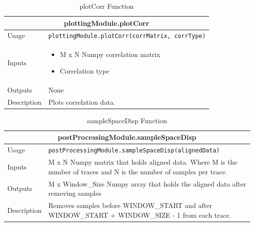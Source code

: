 \documentclass{llncs}
\numberwithin{algorithm}{chapter}
\begin{document}
\begin{table}[H]
\caption{plotCorr Function}
\begin{tabular}{ |p{2cm}||p{11cm}|  }
 \hline
 \multicolumn{2}{|c|}{\cellcolor{teal}\textbf{plottingModule.plotCorr}} \\
 \hline
 Usage & \texttt{plottingModule.plotCorr(corrMatrix, corrType)}\\ \hline
 Inputs & \begin{itemize}
 		  \item M x N Numpy correlation matrix
 		  \item Correlation type 
 		  \end{itemize} \\ \hline
 Outputs & None \\ \hline
 Description & Plots correlation data. \\ \hline
\end{tabular}
\end{table}

\begin{table}[H]
\caption{sampleSpaceDisp Function}
\begin{tabular}{ |p{2cm}||p{11cm}|  }
 \hline
 \multicolumn{2}{|c|}{\cellcolor{teal}\textbf{postProcessingModule.sampleSpaceDisp}} \\
 \hline
 Usage & \texttt{postProcessingModule.sampleSpaceDisp(alignedData)}\\ \hline
 Inputs & M x N Numpy matrix that holds aligned data. Where M is the number of traces and N is the number of samples per trace. \\ \hline
 Outputs & M x Window\_Size Numpy array that holds the aligned data after removing samples  \\ \hline
 Description & Removes samples before WINDOW\_START and after WINDOW\_START + WINDOW\_SIZE - 1 from each trace. \\ \hline
\end{tabular}
\end{table}
\end{document}
